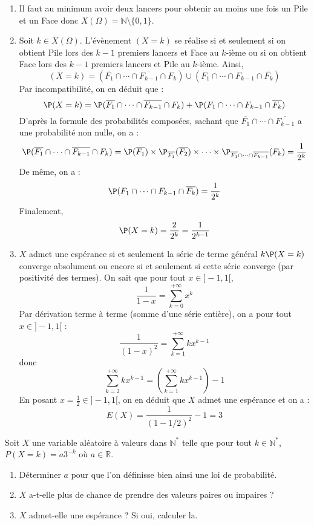 \documentclass[a4paper,twoside,french,11pt]{VcCours}
\begin{document}
\begin{enumerate}
\item Il faut au minimum avoir deux lancers pour obtenir au moins une fois un Pile et un Face donc $X(\Omega)= \mathbb{N} \setminus \lbrace 0,1 \rbrace$.
\item Soit $k \in X(\Omega)$. L'évènement $(X=k)$ se réalise si et seulement si on obtient Pile lors des $k-1$ premiers lancers et Face au $k$-ième ou si on obtient Face lors des $k-1$ premiers lancers et Pile au $k$-ième. Ainsi,
$$ (X=k) = (\overline{F_1} \cap \cdots \cap \overline{F_{k-1}} \cap F_k) \cup      (F_1 \cap \cdots \cap F_{k-1} \cap \overline{F_k} )$$
Par incompatibilité, on en déduit que :
$$ \P(X=k) = \P(\overline{F_1} \cap \cdots \cap \overline{F_{k-1}} \cap F_k) +     \P(F_1 \cap \cdots \cap F_{k-1} \cap \overline{F_k} )$$
D'après la formule des probabilités composées, sachant que $\overline{F_1} \cap \cdots \cap \overline{F_{k-1}}$ a une probabilité non nulle, on a :
$$ \P(\overline{F_1} \cap \cdots \cap \overline{F_{k-1}} \cap F_k) = \P(\overline{F_1}) \times \P_{\overline{F_1}}(\overline{F_2}) \times \cdots \times \P_{\overline{F_1} \cap \cdots \cap \overline{F_{k-1}}}(F_k) = \dfrac{1}{2^k}$$
De même, on a :
$$ \P(F_1 \cap \cdots \cap F_{k-1} \cap \overline{F_k} ) = \dfrac{1}{2^k}$$
Finalement,
$$ \P(X=k) = \dfrac{2}{2^k} = \dfrac{1}{2^{k-1}}$$
\item $X$ admet une espérance si et seulement la série de terme général $k\P(X=k)$ converge absolument ou encore si et seulement si cette série converge (par positivité des termes). On sait que pour tout $x \in ]-1,1[$,
$$ \dfrac{1}{1-x} = \sum_{k=0}^{+ \infty} x^k$$
Par dérivation terme à terme (somme d'une série entière), on a pour tout $x \in ]-1,1[$ :
$$ \dfrac{1}{(1-x)^2} = \sum_{k=1}^{+ \infty} k x^{k-1}$$
donc
$$ \sum_{k=2}^{+ \infty} k x^{k-1} = \left(\sum_{k=1}^{+ \infty} k x^{k-1}\right) -1$$
En posant $x= \tfrac{1}{2} \in ]-1,1[$, on en déduit que $X$ admet une espérance et on a :
$$ E(X) = \dfrac{1}{(1- 1/2)^2} -1= 3$$
\end{enumerate}

\begin{Exercice}{}
 Soit $X$ une variable aléatoire à valeurs dans $\mathbb{N}^*$ telle que pour tout $k \in \mathbb{N}^*$, $P(X=k)=a3^{-k}$ où $a \in \mathbb{R}$.
\begin{enumerate}
\item Déterminer $a$ pour que l'on définisse bien ainsi une loi de probabilité.
\item $X$ a-t-elle plus de chance de prendre des valeurs paires ou impaires ?
\item $X$ admet-elle une espérance ? Si oui, calculer la.
\end{enumerate}
\end{Exercice}
\end{document}
